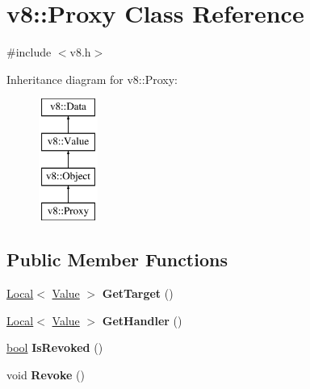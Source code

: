 \hypertarget{classv8_1_1Proxy}{}\section{v8\+:\+:Proxy Class Reference}
\label{classv8_1_1Proxy}


{\ttfamily \#include $<$v8.\+h$>$}

Inheritance diagram for v8\+:\+:Proxy\+:\begin{figure}[H]
\begin{center}
\leavevmode
\includegraphics[height=4.000000cm]{classv8_1_1Proxy}
\end{center}
\end{figure}
\subsection*{Public Member Functions}
\begin{DoxyCompactItemize}
\item 
\mbox{\label{classv8_1_1Proxy_ab02aa5ae2e4c268155504a2a53750438}} 
\mbox{\hyperlink{classv8_1_1Local}{Local}}$<$ \mbox{\hyperlink{classv8_1_1Value}{Value}} $>$ {\bfseries Get\+Target} ()
\item 
\mbox{\label{classv8_1_1Proxy_a5343ef97e20c0e61996d194e1a48e0e4}} 
\mbox{\hyperlink{classv8_1_1Local}{Local}}$<$ \mbox{\hyperlink{classv8_1_1Value}{Value}} $>$ {\bfseries Get\+Handler} ()
\item 
\mbox{\label{classv8_1_1Proxy_ad6100ff322bd5b0297deea20237ff065}} 
\mbox{\hyperlink{classbool}{bool}} {\bfseries Is\+Revoked} ()
\item 
\mbox{\label{classv8_1_1Proxy_a24a05c4dc89a74406456df8c14adff7e}} 
void {\bfseries Revoke} ()
\end{DoxyCompactItemize}

